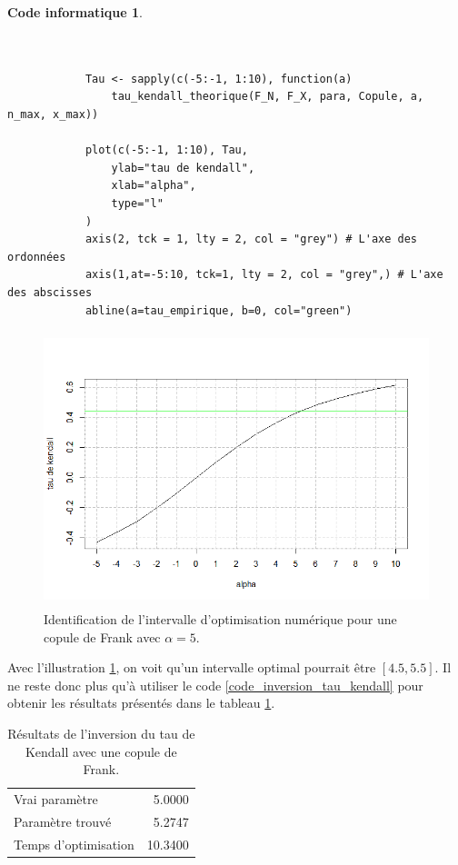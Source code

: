 \documentclass{article}
\newtheorem{code}{Code informatique}
\begin{document}
	 \begin{minipage}[H]{\linewidth}
 	 	 	\begin{code} \label{code_graphique_intervalle}
	 		\begin{verbatim}
	 		
	 		
	 		Tau <- sapply(c(-5:-1, 1:10), function(a)
	 		    tau_kendall_theorique(F_N, F_X, para, Copule, a, n_max, x_max))
	 		
	 		plot(c(-5:-1, 1:10), Tau,
	 		    ylab="tau de kendall",
	 		    xlab="alpha",
	 		    type="l"
	 		)
	 		axis(2, tck = 1, lty = 2, col = "grey") # L'axe des ordonnées
	 		axis(1,at=-5:10, tck=1, lty = 2, col = "grey",) # L'axe des abscisses
	 		abline(a=tau_empirique, b=0, col="green")
	 		\end{verbatim}
 			\end{code}
 	\end{minipage}

	\begin{figure}[H]
		\centering
		\includegraphics[height=8cm]{Graph/intevalle_frank.png}
		\caption[Identification de l'intervalle d'optimisation numérique pour le scénario \ref{scenario_Frank}]
		{Identification de l'intervalle d'optimisation numérique pour une copule de Frank avec $\alpha = 5$.} 
		\label{graph_intervalle_Frank}
	\end{figure}

	Avec l'illustration \ref{graph_intervalle_Frank}, on voit qu'un intervalle optimal pourrait être $[4.5, 5.5]$. Il ne reste donc plus qu'à utiliser le code \ref{code_inversion_tau_kendall} pour obtenir les résultats présentés dans le tableau \ref{tbl_Resultats_Frank}.
	
	\begin{table}[H]
		\centering
		\begin{tabular}{lr}
			\hline
			Vrai paramètre & 5.0000 \\ 
			Paramètre trouvé & 5.2747 \\ 
			Temps d'optimisation & 10.3400 \\ 
			\hline
		\end{tabular}
	\caption{Résultats de l'inversion du tau de Kendall avec une copule de Frank.}
	\label{tbl_Resultats_Frank}
	\end{table}
\end{document}
